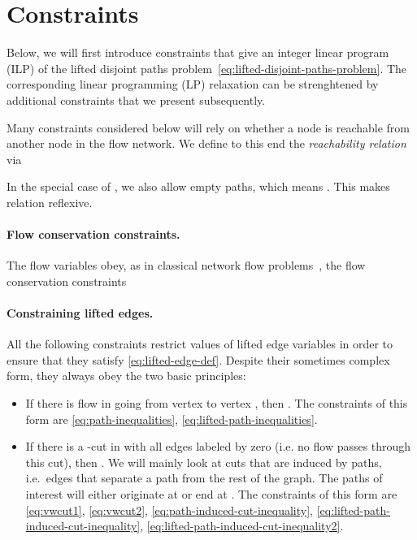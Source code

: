 \documentclass{article}
\begin{document}
  \section{Constraints}
\label{sec:constraints}
Below, we will first introduce constraints that give an integer linear program (ILP) of the lifted disjoint paths problem~\eqref{eq:lifted-disjoint-paths-problem}.
The corresponding linear programming (LP) relaxation can be strenghtened by additional constraints that we present subsequently.


Many constraints considered below will rely on whether a node  is reachable from another node  in the flow network. We define to this end the \emph{reachability relation}  via

In the special case of , we also allow empty paths, which means .
This makes relation  reflexive.

\paragraph{Flow conservation constraints.}
The flow variables  obey, as in classical network flow problems~\cite{ahuja1988network}, the flow conservation constraints




\paragraph{Constraining lifted edges.} 
     All the following constraints restrict values of lifted edge variables  in order to ensure that they satisfy \eqref{eq:lifted-edge-def}. Despite their sometimes complex form, they always obey the two basic principles:
\begin{itemize}
 \item If there is flow in  going from vertex  to vertex , then .
 The constraints of this form are \eqref{eq:path-inequalities}, \eqref{eq:lifted-path-inequalities}.
 \item If there is a -cut in  with all edges labeled by zero (i.e. no flow passes through this cut), then .
 We will mainly look at cuts that are induced by paths, i.e.\ edges that separate a path from the rest of the graph. 
 The paths of interest will either originate at  or end at .
The constraints of this form are \eqref{eq:vwcut1}, \eqref{eq:vwcut2}, \eqref{eq:path-induced-cut-inequality}, \eqref{eq:lifted-path-induced-cut-inequality}, \eqref{eq:lifted-path-induced-cut-inequality2}.
\end{itemize}
\end{document}
